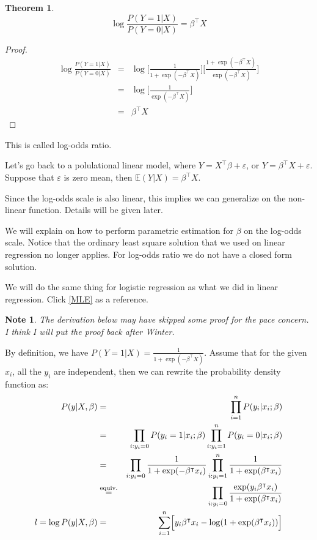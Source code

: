 \documentclass{article}
\theoremstyle{MyNonumberplain}
\theoremstyle{break}
\newtheorem*{proof}{Proof. }
\newcommand{\ve}{\varepsilon}
\newcommand{\ev}{\mathbb{E}}
\newcommand{\T}{^\intercal}
\theoremstyle{break}
\newtheorem{theorem}{Theorem}[section]
\newtheorem{note}{Note}
\theoremstyle{break}
\theoremstyle{break}
\begin{document}
\begin{thmbox}
    \begin{theorem}
        $$\log{\frac{P(Y=1|X)}{P(Y=0|X)}}=\beta\T X$$
    \end{theorem}
    \begin{prfbox}
        \begin{proof}
            \begin{eqnarray*}
                \log{\frac{P(Y=1|X)}{P(Y=0|X)}} &=& \log{\Biggl[\frac{1}{1+\exp(-\beta\T X)}\Biggr]\Biggl[\frac{1+\exp(-\beta\T X)}{\exp(-\beta\T X)}\Biggr]}\\
                                                &=& \log{\Biggl[\frac{1}{\exp(-\beta\T X)}\Biggr]}\\
                                                &=& \beta\T X
            \end{eqnarray*}
        \end{proof}
    \end{prfbox}
    This is called log-odds ratio.
\end{thmbox}

Let's go back to a polulational linear model, where $Y=X\T\beta+\ve$, or $Y=\beta\T X+\ve$. Suppose that $\ve$ is zero mean, then $\ev(Y\vert X)=\beta\T X$.

Since the log-odds scale is also linear, this implies we can generalize on the non-linear function. Details will be given later.

We will explain on how to perform parametric estimation for $\beta$ on the log-odds scale. 
Notice that the ordinary least square solution that we used on linear regression no longer applies.
For log-odds ratio we do not have a closed form solution. 

We will do the same thing for logistic regression as what we did in linear regression. Click \ref{MLE} as a reference.

\begin{notebox}
    \begin{note}
        The derivation below may have skipped some proof for the pace concern. I think I will put the proof back after Winter.
    \end{note}
\end{notebox}

By definition, we have $P(Y=1|X)=\frac{1}{1+\exp(-\beta\T X)}.$ Assume that for the given $x_i$, all the $y_i$ are independent, then we can rewrite the probability
density function as:
\begin{eqnarray*}
    P(y\vert X,\beta) &=& \prod_{i=1}^n P(y_i\vert x_i;\beta)\\
                      &=& \prod_{i:y_i=0}P(y_i=1\vert x_i;\beta) \prod_{i:y_i=1}^nP(y_i=0\vert x_i;\beta)\\
                      &=& \prod_{i:y_i=0}\frac{1}{1+\exp(-\beta\T x_i)} \prod_{i:y_i=1}^n\frac{1}{1+\exp(\beta\T x_i)}\\
                      &\overset{\text{equiv.}}{=}& \prod_{i:y_i=0}\frac{\exp(y_i\beta\T x_i)}{1+\exp(\beta\T x_i)}\\
    l=\log P(y\vert X,\beta) &=& \sum_{i=1}^n \Bigl[y_i\beta\T x_i-\log(1+\exp(\beta\T x_i))\Bigr]
\end{eqnarray*}
\end{document}
